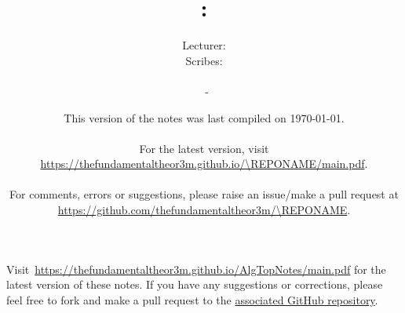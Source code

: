 \documentclass[a4paper, 12pt, openany, oneside]{book}
\title{\vspace{-2em} {\huge \COURSENUMBER: \COURSENAME}}
\author{
    Lecturer: \LECTURER \\
    Scribes: \SCRIBE
    \\ \hfill \\
    \UNIVERSITY\ - \TERM}
\date{
    This version of the notes was last compiled on \today.
    \\ \hfill \\
    For the latest version, visit \url{https://thefundamentaltheor3m.github.io/\REPONAME/main.pdf}.
    \\ \hfill \\
    For comments, errors or suggestions, please raise an issue/make a pull request at \url{https://github.com/thefundamentaltheor3m/\REPONAME}.
}
\def\REPONAME{AlgTopNotes}
\begin{document}
\setlength{\abovedisplayskip}{7.5pt}  %
\setlength{\belowdisplayskip}{7.5pt}  %
\setlength{\abovedisplayshortskip}{2pt}
\setlength{\belowdisplayshortskip}{2pt}

\maketitle
\thispagestyle{empty}

\tableofcontents
\thispagestyle{empty}

\newpage

\nocite{*}






% 

\newpage




\printbibliography[prenote=mybibnote]
\thispagestyle{empty}

Visit~\url{https://thefundamentaltheor3m.github.io/\REPONAME/main.pdf} for the latest version of these notes. If you have any suggestions or corrections, please feel free to fork and make a pull request to the \href{https://github.com/thefundamentaltheor3m/\REPONAME}{associated GitHub repository}.
\end{document}
